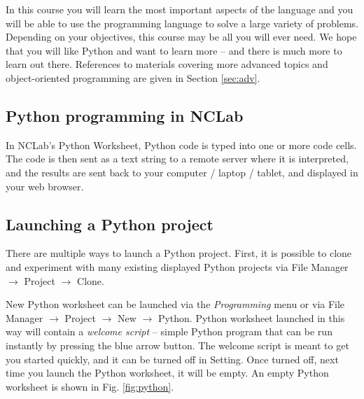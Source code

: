 \documentclass[article,A4,12pt]{llncs}
\begin{document}
In this course you will 
learn the most important aspects of the language and you will be able to 
use the programming language to solve a large variety of problems. 
Depending on your objectives, this course may be all you will ever need. 
We hope that you will like Python and want to learn more -- and there is much 
more to learn out there. References to materials covering more advanced topics 
and object-oriented programming are given in Section \ref{sec:adv}.

\subsection{Python programming in NCLab}

In NCLab's Python Worksheet, Python code is typed into one or more code cells. 
The code is then sent as a text string to a remote server where it is interpreted, and the 
results are sent back to your computer / laptop / tablet, and displayed in your web 
browser.


\subsection{Launching a Python project}


There are multiple ways to launch a Python project. First, it is 
possible to clone and experiment with many existing displayed Python 
projects via File Manager $\rightarrow$ 
Project $\rightarrow$ Clone. 

New Python worksheet can be launched via 
the {\em Programming} menu or via File Manager $\rightarrow$ 
Project $\rightarrow$ New $\rightarrow$ Python. Python worksheet
launched in this way will contain a {\em welcome script} -- simple Python 
program that can be run instantly by pressing the blue arrow button. 
The welcome script is meant to get you started quickly, and it can 
be turned off in Setting. Once turned off, next time you launch the 
Python worksheet, it will be empty. An empty Python worksheet
is shown in Fig. \ref{fig:python}.
\end{document}

